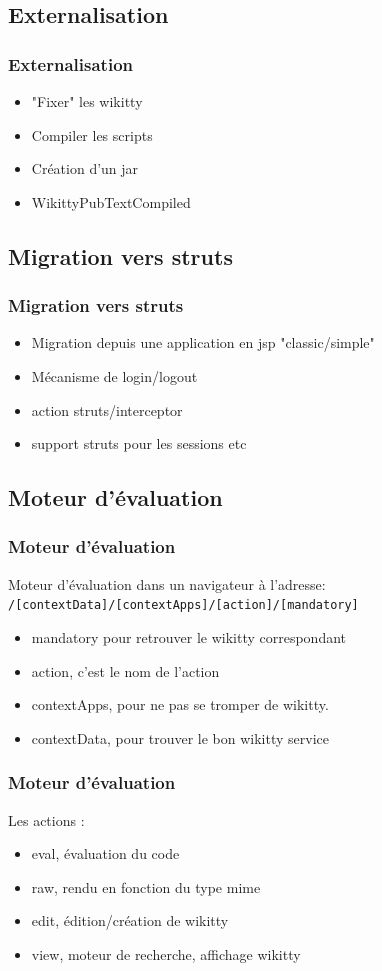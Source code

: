 \documentclass[12pt,a4paper,utf8x]{beamer}
\begin{document}
\subsection*{Externalisation}
\begin{frame}\frametitle{Externalisation}
\begin{itemize}
\item "Fixer" les wikitty
\item Compiler les scripts
\item Création d'un jar
\item WikittyPubTextCompiled
\end{itemize}
\end{frame}

\subsection*{Migration vers struts}
\begin{frame}\frametitle{Migration vers struts}
\begin{itemize}
\item Migration depuis une application en jsp "classic/simple"
\item Mécanisme de login/logout
\item action struts/interceptor
\item support struts pour les sessions etc
\end{itemize}
\end{frame}




\subsection*{Moteur d'évaluation}
\begin{frame}\frametitle{Moteur d'évaluation}

Moteur d'évaluation dans un navigateur à l'adresse:\\
\verb!/[contextData]/[contextApps]/[action]/[mandatory]!

\begin{itemize}
\item mandatory pour retrouver le wikitty correspondant
\item action, c'est le nom de l'action
\item contextApps, pour ne pas se tromper de wikitty.
\item contextData, pour trouver le bon wikitty service
\end{itemize}



\end{frame}
\begin{frame}\frametitle{Moteur d'évaluation}
Les actions :
\begin{itemize}
\item eval, évaluation du code
\item raw, rendu en fonction du type mime
\item edit, édition/création de wikitty
\item view, moteur de recherche, affichage wikitty
\end{itemize}
\end{frame}
\end{document}
